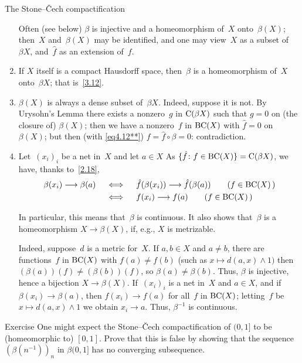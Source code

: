 \documentclass[main.tex]{subfiles}
\begin{document}
\begin{psec}{4.12}{The Stone--\v{C}ech compactification}
\begin{enumerate}[label=(\Roman*)]
Often (see below) $\beta$ is injective
and a homeomorphism of~$X$ onto~$\beta(X)$;
then~$X$ and~$\beta(X)$ may be identified,
and one may view~$X$ as a subset of~$\beta X$,
and~$\hat f$ as an extension of~$f$.
%
\item \label{4.12-III}
If $X$ itself is a compact Hausdorff space,
then~$\beta$ is a homeomorphism of~$X$ onto~$\beta X$;
that is~\ref{3.12}.
%
\item \label{4.12-IV}
$\beta(X)$ is always a dense subset of~$\beta X$.
Indeed, suppose it is not.
By Urysohn's Lemma
there exists a nonzero~$g$ in $\mathrm{C}(\beta X)$
such that $g=0$ on (the closure of) $\beta(X)$;
then we have a nonzero~$f$ in $\mathrm{BC}(X)$
with $\hat f = 0$ on~$\beta (X)$;
but then (with \eqref{eq4.12**}) 
$f = \hat f \circ \beta = 0$:
contradiction.
\item \label{4.12-V}
Let~$(x_i)_i$ be a net in~$X$
and let $a\in X$
As $\{\hat f\colon f\in\mathrm{BC}(X)\}=\mathrm{C}(\beta X)$,
we have,
thanks to~\ref{2.18},
\begin{alignat*}{2}
\beta(x_i) \longrightarrow \beta(a) 
& \quad\iff\quad \hat f(\beta(x_i))\longrightarrow \hat f(\beta(a))\qquad
 (f\in \BCont{X}\,)\\
& \quad\iff\quad f(x_i)\longrightarrow f(a) \qquad
 (f\in \BCont{X}\,)
\end{alignat*}

In particular,
this means that~$\beta$ is continuous.
It also shows that~$\beta$ is a homeomorphism $X\rightarrow \beta(X)$,
if, e.g., $X$ is metrizable.

Indeed,
suppose~$d$ is a metric for~$X$.
If $a,b\in X$ and $a\neq b$,
there are functions~$f$ in $\mathrm{BC}(X)$
with $f(a)\neq f(b)$ (such as $x\mapsto d(a,x)\wedge 1)$
then $(\beta(a))(f)\neq (\beta(b))(f)$,
so $\beta(a)\neq\beta(b)$.
Thus,
$\beta$ is injective,
hence a bijection $X\rightarrow \beta(X)$.
If~$(x_i)_i$ is a net in~$X$
and $a\in X$,
and if $\beta(x_i)\rightarrow \beta(a)$,
then $f(x_i)\rightarrow f(a)$ for all~$f$ in $\mathrm{BC}(X)$;
letting~$f$ be $x\mapsto d(a,x)\wedge 1$
we obtain $x_i\rightarrow a$.
Thus,
$\beta^{-1}$ is continuous.
\end{enumerate}
\end{psec}
%
%
\begin{psec}{4.13}{Exercise}
One might expect the Stone--\v{C}ech compactification of
$(0,1]$ to be (homeomorphic to) $[0,1]$.
Prove that this is false 
by showing that the sequence $(\beta(n^{-1}))_n$ in $\beta(0,1]$
has no converging subsequence.
\end{psec}
\end{document}
